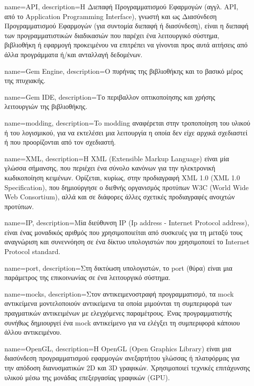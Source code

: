 {
	name=API,
	description={H Διεπαφή Προγραμματισμού Εφαρμογών (αγγλ. API, από το Application Programming Interface), γνωστή και ως Διασύνδεση Προγραμματισμού Εφαρμογών (για συντομία διεπαφή ή διασύνδεση), είναι η διεπαφή των προγραμματιστικών διαδικασιών που παρέχει ένα λειτουργικό σύστημα, βιβλιοθήκη ή εφαρμογή προκειμένου να επιτρέπει να γίνονται προς αυτά αιτήσεις από άλλα προγράμματα ή/και ανταλλαγή δεδομένων.}
}

{
	name=Gem Engine,
	description={Ο πυρήνας της βιβλιοθήκης και το βασικό μέρος της πτυχιακής.}
}

{
	name=Gem IDE,
	description={Το περιβαλλον οπτικοποίησης και χρήσης λειτουργιών της βιβλιοθήκης.}
}

{
	name=modding,
	description={To modding αναφέρεται στην τροποποίηση του υλικού ή του λογισμικού, για να εκτελέσει μια λειτουργία η οποία δεν είχε αρχικά σχεδιαστεί ή που προορίζονται από τον σχεδιαστή.}
}

{
	name=XML,
	description={H XML (Extensible Markup Language) είναι μία γλώσσα σήμανσης, που περιέχει ένα σύνολο κανόνων για την ηλεκτρονική κωδικοποίηση κειμένων. Ορίζεται, κυρίως, στην προδιαγραφή XML 1.0 (XML 1.0 Specification), που δημιούργησε ο διεθνής οργανισμός προτύπων W3C (World Wide Web Consortium), αλλά και σε διάφορες άλλες σχετικές προδιαγραφές ανοιχτών προτύπων.}
}

{
	name=IP,
	description={Μία διεύθυνση IP (Ip address - Internet Protocol address), είναι ένας μοναδικός αριθμός που χρησιμοποιείται από συσκευές για τη μεταξύ τους αναγνώριση και συνεννόηση σε ένα δίκτυο υπολογιστών που χρησιμοποιεί το Internet Protocol standard. }
}

{
	name=port,
	description={Στη δικτύωση υπολογιστών, το port (θύρα) είναι μια παράμετρος της επικοινωνίας σε ένα λειτουργικό σύστημα.}
}

{
	name=mocks,
	description={Στον αντικειμενοστραφή προγραμματισμό, τα mock αντικείμενα μοντελοποιούν αντικείμενα τα οποία μιμούνται τη συμπεριφορά των πραγματικών αντικειμένων με ελεγχόμενες παραμέτρους. Ένας προγραμματιστής συνήθως δημιουργεί ένα mock αντικείμενο για να ελέγξει τη συμπεριφορά κάποιου άλλου αντικειμένου.}
}

{
	name=OpenGL,
	description={H OpenGL (Open Graphics Library) είναι μια διασύνδεση προγραμματισμού εφαρμογών ανεξαρτήτου γλώσσας ή πλατφόρμας για την απόδοση διανυσματικών 2D και 3D γραφικών. Χρησιμοποιεί τεχνικές επιτάχυνσης υλικού μέσω της μονάδας επεξεργασίας γραφικών (GPU).}
}

